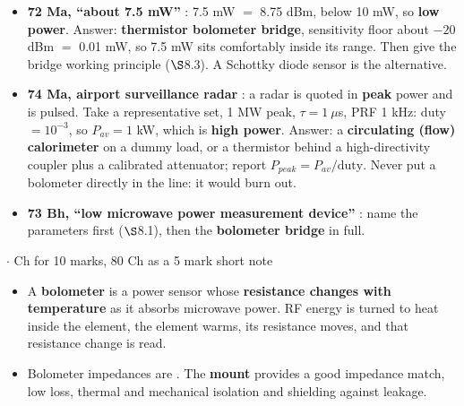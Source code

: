 \par{}
\begin{itemize}
  \item \textbf{72 Ma, ``about 7.5 mW''} : 7.5 mW $=$ 8.75 dBm, below 10 mW, so
    \textbf{low power}. Answer: \textbf{thermistor bolometer bridge}, sensitivity floor
    about $-20$ dBm $=$ 0.01 mW, so 7.5 mW sits comfortably inside its range. Then give the
    bridge working principle ($\S$8.3). A Schottky diode sensor is the alternative.
  \item \textbf{74 Ma, airport surveillance radar} : a radar is quoted in \textbf{peak}
    power and is pulsed. Take a representative set, 1 MW peak, $\tau = 1\ \mu$s,
    PRF 1 kHz: duty $= 10^{-3}$, so $P_{av} = 1$ kW, which is \textbf{high power}. Answer:
    a \textbf{circulating (flow) calorimeter} on a dummy load, or a thermistor behind a
    high-directivity coupler plus a calibrated attenuator; report
    $P_{peak} = P_{av}/\text{duty}$. Never put a bolometer directly in the line: it would
    burn out.
  \item \textbf{73 Bh, ``low microwave power measurement device''} : name the parameters
    first ($\S$8.1), then the \textbf{bolometer bridge} in full.
\end{itemize}

\vspace{2pt}


{\color{sub}\footnotesize {}  \gap$\cdot$ Ch for 10 marks, 80 Ch as a 5 mark short note}

\begin{itemize}
  \item A \textbf{bolometer} is a power sensor whose \textbf{resistance changes with
    temperature} as it absorbs microwave power. RF energy is turned to heat inside the
    element, the element warms, its resistance moves, and that resistance change is read.
  \item Bolometer impedances are . The \textbf{mount} provides a good
    impedance match, low loss, thermal and mechanical isolation and shielding against
    leakage.
\end{itemize}

